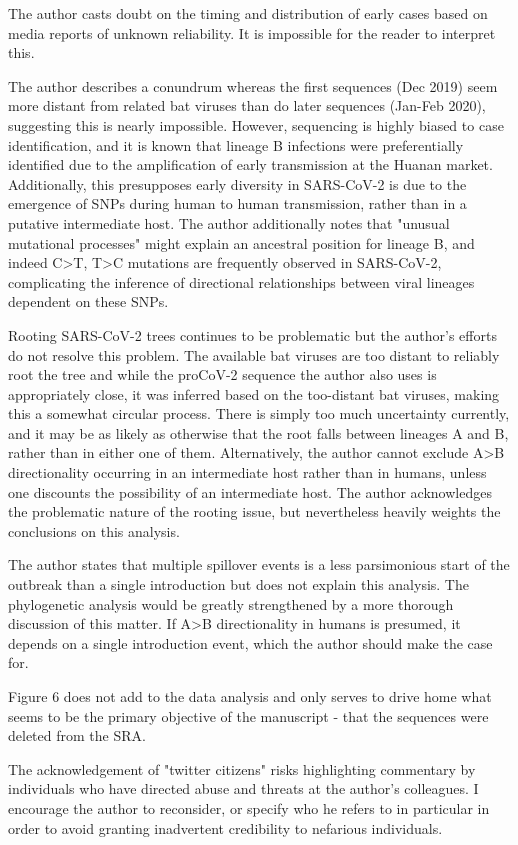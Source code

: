 \documentclass[11pt, oneside]{article}   	%
\begin{document}
The author casts doubt on the timing and distribution of early cases based on media reports of unknown reliability. It is impossible for the reader to interpret this.

The author describes a conundrum whereas the first sequences (Dec 2019) seem more distant from related bat viruses than do later sequences (Jan-Feb 2020), suggesting this is nearly impossible. However, sequencing is highly biased to case identification, and it is known that lineage B infections were preferentially identified due to the amplification of early transmission at the Huanan market. Additionally, this presupposes early diversity in SARS-CoV-2 is due to the emergence of SNPs during human to human transmission, rather than in a putative intermediate host. The author additionally notes that "unusual mutational processes" might explain an ancestral position for lineage B, and indeed C>T, T>C mutations are frequently observed in SARS-CoV-2, complicating the inference of directional relationships between viral lineages dependent on these SNPs.

Rooting SARS-CoV-2 trees continues to be problematic but the author's efforts do not resolve this problem. The available bat viruses are too distant to reliably root the tree and while the proCoV-2 sequence the author also uses is appropriately close, it was inferred based on the too-distant bat viruses, making this a somewhat circular process. There is simply too much uncertainty currently, and it may be as likely as otherwise that the root falls between lineages A and B, rather than in either one of them. Alternatively, the author cannot exclude A>B directionality occurring in an intermediate host rather than in humans, unless one discounts the possibility of an intermediate host. The author acknowledges the problematic nature of the rooting issue, but nevertheless heavily weights the conclusions on this analysis.

The author states that multiple spillover events is a less parsimonious start of the outbreak than a single introduction but does not explain this analysis. The phylogenetic analysis would be greatly strengthened by a more thorough discussion of this matter. If A>B directionality in humans is presumed, it depends on a single introduction event, which the author should make the case for.

Figure 6 does not add to the data analysis and only serves to drive home what seems to be the primary objective of the manuscript - that the sequences were deleted from the SRA.

The acknowledgement of "twitter citizens" risks highlighting commentary by individuals who have directed abuse and threats at the author's colleagues. I encourage the author to reconsider, or specify who he refers to in particular in order to avoid granting inadvertent credibility to nefarious individuals.

\color{black}

{\small

}
\end{document}

